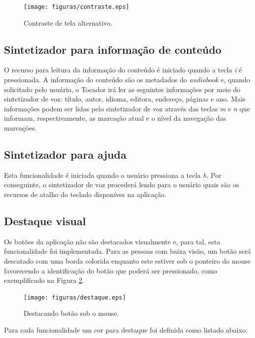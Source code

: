  \begin{figure}[ht]
	\centering
		\texttt{[image: figuras/contraste.eps]}
	\caption{Contraste de tela alternativo.}
	\label{contraste}
\end{figure}

\subsection{Sintetizador para informação de conteúdo}\label{ttscontent}

O recurso para leitura da informação do conteúdo é iniciado quando a tecla \textit{i} é pressionada. A informação do conteúdo são os metadados do \textit{audiobook} e, quando solicitado pelo usuário, o Tocador irá ler as seguintes informações por meio do sintetizador de voz: título, autor, idioma, editora, endereço, páginas e ano. Mais informações podem ser lidas pelo sintetizador de voz através das teclas \textit{m} e \textit{n} que informam, respectivamente, as marcação atual e o nível da navegação das marcações.

\subsection{Sintetizador para ajuda}\label{ttshelp}

Esta funcionalidade é iniciada quando o usuário pressiona a tecla \textit{h}. Por conseguinte, o sintetizador de voz procederá lendo para o usuário quais são os recursos de atalho do teclado disponíves na aplicação.

\subsection{Destaque visual}

Os botões da aplicação não são destacados visualmente e, para tal, esta funcionalidade foi implementada. Para as pessoas com baixa visão, um botão será descatado com uma borda colorida enquanto este estiver sob o ponteiro do mouse favorecendo a identificação do botão que poderá ser pressionado, como exemplificado na Figura \ref{destaque}.

 \begin{figure}[ht]
	\centering
		\texttt{[image: figuras/destaque.eps]}
	\caption{Destacando botão sob o mouse.}
	\label{destaque}
\end{figure}

Para cada funcionalidade um cor para destaque foi definida como listado abaixo:

